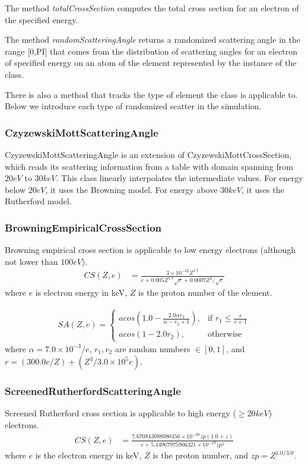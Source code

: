 The method \textit{totalCrossSection} computes the total cross section for an electron of the specified energy.

The method \textit{randomScatteringAngle} returns a randomized scattering angle in the range [0,PI] that comes from the distribution of scattering angles for an electron of specified energy on an atom of the element represented by the instance of the class.

There is also a method that tracks the type of element the class is applicable to. Below we introduce each type of randomized scatter in the simulation.

\subsubsection{CzyzewskiMottScatteringAngle}
CzyzewskiMottScatteringAngle is an extension of CzyzewskiMottCrossSection, which reads its scattering information from a table with domain spanning from $20 eV$ to $30 keV$. This class linearly interpolates the intermediate values. For energy below $20 eV$, it uses the Browning model. For energy above $30 keV$, it uses the Rutherford model.

\subsubsection{BrowningEmpiricalCrossSection}
Browning empirical cross section is applicable to low energy electrons (although not lower than $100eV$). 
\begin{align*}
   CS(Z, e) &= \frac{3\times 10^{-22} Z^{1.7}}{e + 0.005 Z^{1.7} \sqrt{e} + 0.0007 Z^{2} / \sqrt{e}}
\end{align*}
where $e$ is electron energy in keV, $Z$ is the proton number of the element.

\begin{align*}
    SA(Z, e)= 
\begin{cases}
    acos\left (1.0 - \frac{2.0 \alpha r_2}{\alpha - r_2 + 1}\right ),& \text{if } r_1 \leq \frac{r}{r+1}\\
    acos(1-2.0r_2),& \text{otherwise}
\end{cases}
\end{align*}
where $\alpha = 7.0\times 10^{-3}/e$, $r_1, r_2$ are random numbers $\in [0, 1]$, and $r = (300.0 e / Z) + (Z^3 / 3.0\times 10^5 e)$.

\subsubsection{ScreenedRutherfordScatteringAngle}
Screened Rutherford cross section is applicable to high energy ($\geq 20keV$) electrons. 
\begin{align*}
   CS(Z, e) &= \frac{7.670843088080456\times 10^{-38} zp (1.0 + z)}{e + 5.44967975966321\times 10^{-19} zp^2}
\end{align*}
where $e$ is the electron energy in keV, $Z$ is the proton number, and $zp = Z^{1.0/3.0}$.

